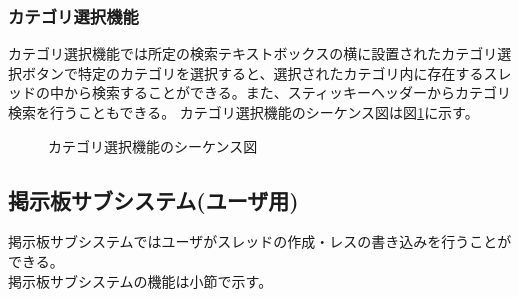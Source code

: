 \documentclass[a4j]{jarticle}
\begin{document}
  \subsubsection{カテゴリ選択機能}
  カテゴリ選択機能では所定の検索テキストボックスの横に設置されたカテゴリ選択ボタンで特定のカテゴリを選択すると、選択されたカテゴリ内に存在するスレッドの中から検索することができる。また、スティッキーヘッダーからカテゴリ検索を行うこともできる。
  カテゴリ選択機能のシーケンス図は図\ref{fig:search_category.png}に示す。
  \begin{figure}[H]
    \centering
    \caption{カテゴリ選択機能のシーケンス図}
    \label{fig:search_category.png}
  \end{figure}
  \subsection{掲示板サブシステム(ユーザ用)}
  掲示板サブシステムではユーザがスレッドの作成・レスの書き込みを行うことができる。\\
  掲示板サブシステムの機能は小節で示す。
\end{document}
